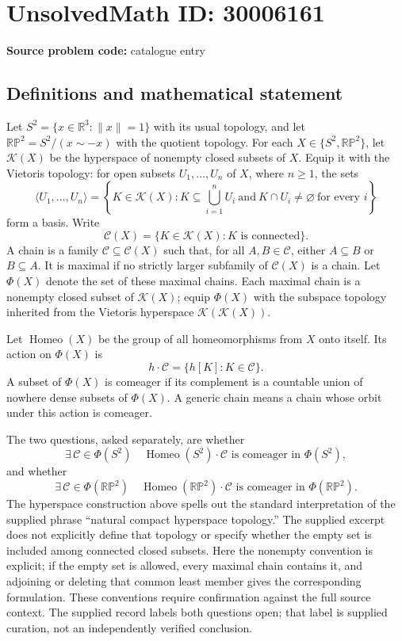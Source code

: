 \documentclass[11pt]{article}
\newcommand{\R}{\mathbb{R}}
\begin{document}
\section*{UnsolvedMath ID: 30006161}
\textbf{Source problem code:} catalogue entry
\subsection{Definitions and mathematical statement}
Let \(S^2=\{x\in\R^3:\|x\|=1\}\) with its usual topology, and let \(\mathbb{RP}^2=S^2/(x\sim -x)\) with the quotient topology. For each \(X\in\{S^2,\mathbb{RP}^2\}\), let \(\mathcal K(X)\) be the hyperspace of nonempty closed subsets of \(X\). Equip it with the Vietoris topology: for open subsets \(U_1,\ldots,U_n\) of \(X\), where \(n\geq 1\), the sets
\[
\langle U_1,\ldots,U_n\rangle
=\left\{K\in\mathcal K(X):K\subseteq\bigcup_{i=1}^nU_i\ \text{and}\ K\cap U_i\ne\varnothing\ \text{for every }i\right\}
\]
form a basis. Write
\[
\mathcal C(X)=\{K\in\mathcal K(X):K\text{ is connected}\}.
\]
A chain is a family \(\mathscr C\subseteq\mathcal C(X)\) such that, for all \(A,B\in\mathscr C\), either \(A\subseteq B\) or \(B\subseteq A\). It is maximal if no strictly larger subfamily of \(\mathcal C(X)\) is a chain. Let \(\Phi(X)\) denote the set of these maximal chains. Each maximal chain is a nonempty closed subset of \(\mathcal K(X)\); equip \(\Phi(X)\) with the subspace topology inherited from the Vietoris hyperspace \(\mathcal K(\mathcal K(X))\).

Let \(\operatorname{Homeo}(X)\) be the group of all homeomorphisms from \(X\) onto itself. Its action on \(\Phi(X)\) is
\[
h\cdot\mathscr C=\{h[K]:K\in\mathscr C\}.
\]
A subset of \(\Phi(X)\) is comeager if its complement is a countable union of nowhere dense subsets of \(\Phi(X)\). A generic chain means a chain whose orbit under this action is comeager.

The two questions, asked separately, are whether
\[
\exists\,\mathscr C\in\Phi(S^2)\quad
\operatorname{Homeo}(S^2)\cdot\mathscr C
\text{ is comeager in }\Phi(S^2),
\]
and whether
\[
\exists\,\mathscr C\in\Phi(\mathbb{RP}^2)\quad
\operatorname{Homeo}(\mathbb{RP}^2)\cdot\mathscr C
\text{ is comeager in }\Phi(\mathbb{RP}^2).
\]
The hyperspace construction above spells out the standard interpretation of the supplied phrase ``natural compact hyperspace topology.'' The supplied excerpt does not explicitly define that topology or specify whether the empty set is included among connected closed subsets. Here the nonempty convention is explicit; if the empty set is allowed, every maximal chain contains it, and adjoining or deleting that common least member gives the corresponding formulation. These conventions require confirmation against the full source context. The supplied record labels both questions open; that label is supplied curation, not an independently verified conclusion.
\end{document}
